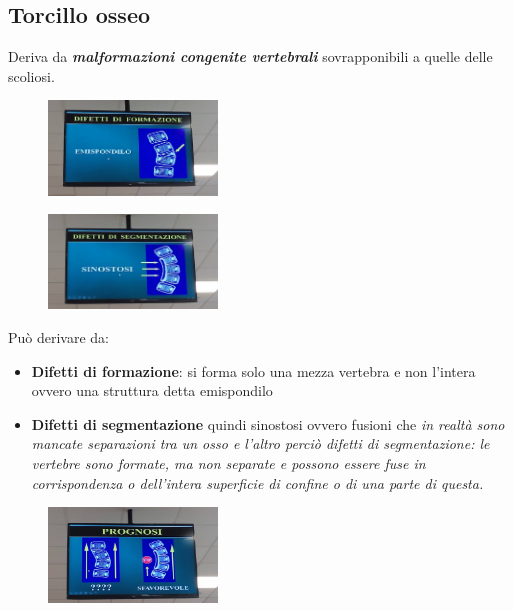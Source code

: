 \subsection{Torcillo osseo}

Deriva da \textbf{\emph{malformazioni congenite vertebrali}} sovrapponibili a quelle delle scoliosi.

\begin{figure}[!ht]
\centering
\includegraphics[width=0.4\textwidth]{013/image17.jpeg}
\end{figure}

\begin{figure}[!ht]
\centering
\includegraphics[width=0.4\textwidth]{013/image18.jpeg}
\end{figure}

Può derivare da:

\begin{itemize}
\item
  \textbf{Difetti di formazione}: si forma solo una mezza vertebra e non l'intera ovvero una struttura detta emispondilo
\item
  \textbf{Difetti di segmentazione} quindi sinostosi ovvero fusioni che \emph{in realtà sono mancate separazioni tra un osso e l'altro perciò difetti di segmentazione: le vertebre sono formate, ma non separate e possono essere fuse in corrispondenza o dell'intera superficie di confine o di una parte di questa. }
\end{itemize}

\begin{figure}[!ht]
\centering
\includegraphics[width=0.4\textwidth]{013/image19.jpeg}
\end{figure}

